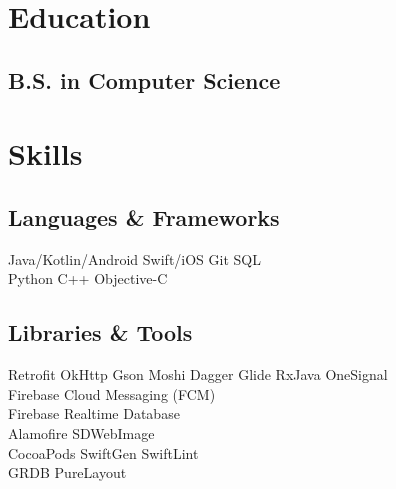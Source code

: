 \documentclass[]{Resume}
\begin{document}
%
%
\lastupdated

%
%

%
%

\begin{minipage}[t]{0.33\textwidth} 


\section{Education} 

\subsection{B.S. in Computer Science}
\sectionsep

\section{Skills}
\subsection{Languages \& Frameworks}
Java/Kotlin/Android \textbullet{} Swift/iOS
Git \textbullet{} SQL \\
Python \textbullet{} C++ \textbullet{} Objective-C
\sectionsep

\subsection{Libraries \& Tools}
Retrofit \textbullet{} OkHttp \textbullet{} Gson \textbullet{} Moshi  \textbullet{} 
Dagger \textbullet{} Glide \textbullet{} RxJava \textbullet{} OneSignal \\
\vspace{\topsep}
Firebase Cloud Messaging (FCM) \textbullet{} \\
Firebase Realtime Database \textbullet{} \\
Alamofire \textbullet{} SDWebImage \textbullet{} \\
CocoaPods \textbullet{} SwiftGen \textbullet{} SwiftLint \textbullet{}  \\
GRDB  \textbullet{} PureLayout
\sectionsep


\end{minipage}
\end{document}
